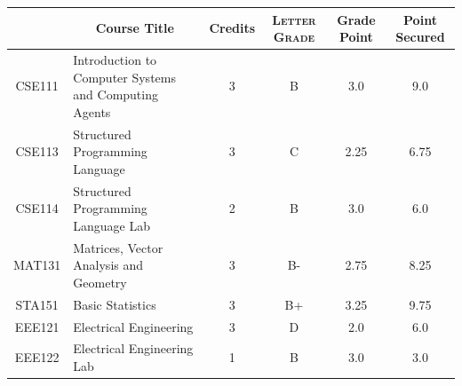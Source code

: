 \documentclass[11pt]{article}
\newcommand*{\numtwo}[1]{\pgfmathprintnumber[
                    fixed, precision=2, fixed zerofill=true]{#1}}
\begin{document}
                \begin{center}
                    \renewcommand{\arraystretch}{1.08}
                    
                \begin{tabular}{|c|l|c|>{\scshape}c|c|c|}
                \hline  \rule[-1ex]{0pt}{3.5ex} {\centering{\bf Course Code}} &  \multicolumn{1}{c|}{\textbf{Course Title}}  & {\bf Credits} & {\bf Letter Grade} & {\bf Grade Point} & {\bf Point Secured}  \\ 
                \hline   CSE111 &  Introduction to Computer Systems and Computing Agents		 & 3 & B & 3.0 & 9.0 \\ %
                \hline   CSE113 &  Structured Programming Language		 & 3 & C & 2.25 & 6.75 \\ %
                \hline   CSE114 &  Structured Programming Language Lab		 & 2 & B & 3.0 & 6.0 \\ %
                \hline   MAT131 &  Matrices, Vector Analysis and Geometry		 & 3 & B- & 2.75 & 8.25 \\ %
                \hline   STA151 &  Basic Statistics		 & 3 & B+ & 3.25 & 9.75 \\ %
                \hline   EEE121 &  Electrical Engineering		 & 3 & D & 2.0 & 6.0 \\ %
                \hline   EEE122 &  Electrical Engineering Lab		 & 1 & B & 3.0 & 3.0 \\ %

\hline                %
                \end{tabular}
                \end{center}
                \renewcommand{\arraystretch}{1.03}
\end{document}
